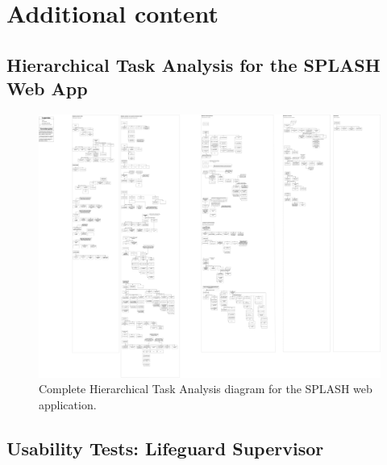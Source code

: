 \chapter{Additional content}
\appendix
\section{Hierarchical Task Analysis for the SPLASH Web App}
\label{appendix:hta}

\begin{figure}[p]
  \centering
  \includegraphics[width=\textwidth,height=0.9\textheight,keepaspectratio]{figs/HierarchicalTaskAnalysis.jpg}
  \caption{Complete Hierarchical Task Analysis diagram for the SPLASH web application.}
  \label{fig:hta-splash-appendix}
\end{figure}
\clearpage
\section{Usability Tests: Lifeguard Supervisor}
\label{section:task_supervisor}


